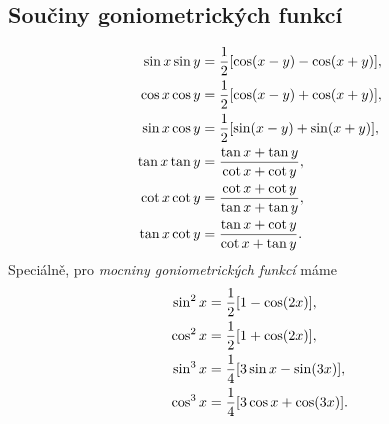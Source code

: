 \documentclass[columns=2]{cheatsheet}
\begin{document}
\subsection{Součiny goniometrických funkcí}
\begin{align*}
  \sin x \sin y 
  &= 
  \frac{1}{2} \brackets{\cos \parens{x - y} - \cos \parens{x + y}},
  \\
  \cos x \cos y 
  &= 
  \frac{1}{2} \brackets{\cos \parens{x - y} + \cos \parens{x + y}},
  \\
  \sin x \cos y 
  &= 
  \frac{1}{2} \brackets{\sin \parens{x - y} + \sin \parens{x + y}},
  \\
  \tan x \tan y 
  &=
  \frac{\tan x + \tan y}{\cot x + \cot y},
  \\
  \cot x \cot y
  &=
  \frac{\cot x + \cot y}{\tan x + \tan y},
  \\
  \tan x \cot y
  &=
  \frac{\tan x + \cot y}{\cot x + \tan y}.
\end{align*}
Speciálně, pro \emph{mocniny goniometrických funkcí} máme
\begin{align*}
  \sin^2 x
  &= 
  \frac{1}{2} \brackets{1 - \cos \parens{2x}},
  \\
  \cos^2 x
  &= 
  \frac{1}{2} \brackets{1 + \cos \parens{2x}},
  \\
  \sin^3 x
  &= 
  \frac{1}{4} \brackets{3 \sin x - \sin \parens{3x}},
  \\
  \cos^3 x
  &= 
  \frac{1}{4} \brackets{3 \cos x + \cos \parens{3x}}.
\end{align*}
\end{document}
